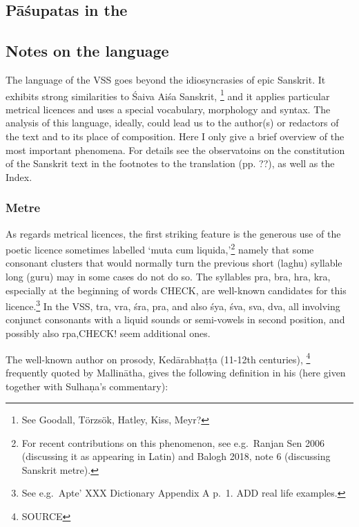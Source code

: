 \documentclass[11pt]{book}
\begin{document}
\subsection{Pāśupatas in the \VSS}


\vfill
\pagebreak

\subsection{Notes on the language}

\noindent
The language of the VSS goes beyond the idiosyncrasies of epic Sanskrit.
It exhibits strong similarities to Śaiva Aiśa Sanskrit,%
		\footnote{See Goodall, Törzsök, Hatley, Kiss, Meyr?} 
and it applies particular metrical licences and 
uses a special vocabulary, morphology and syntax.
The analysis of this language, ideally, could lead us to the 
author(s) or redactors of the text and to its
place of composition. Here I only give a brief overview of the most
important phenomena. For details see the observatoins 
on the constitution of the Sanskrit text in the footnotes 
to the translation (pp. ??), as well as the Index.


\subsubsection{Metre}
As regards metrical licences, the first striking feature is the generous
use of the poetic licence sometimes labelled `muta cum
liquida,'\footnote{For recent contributions on this phenomenon, see
  e.g.~Ranjan Sen 2006 (discussing it as appearing in Latin) and Balogh
  2018, note 6 (discussing Sanskrit metre).} namely that some consonant
clusters that would normally turn the previous short (laghu) syllable
long (guru) may in some cases do not do so. The syllables pra, bra, hra,
kra, especially at the beginning of words CHECK, are well-known
candidates for this licence.\footnote{See e.g.~Apte' XXX Dictionary
  Appendix A p.~1. ADD real life examples.} In the VSS, tra, vra, śra,
pra, and also śya, śva, sva, dva, all involving conjunct consonants with
a liquid sounds or semi-vowels in second position, and possibly also
rpa,CHECK! seem additional ones.

The well-known author on prosody, Kedārabhaṭṭa (11-12th centuries),%
		\footnote{SOURCE}	 
frequently quoted by Mallinātha, gives the following definition in his
 (here given together with Sulhaṇa's  commentary):
\end{document}
